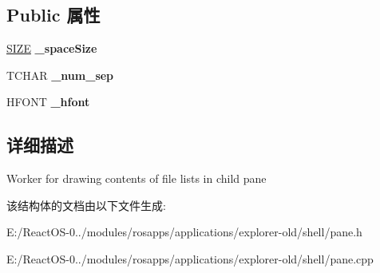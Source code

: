 \subsection*{Public 属性}
\begin{DoxyCompactItemize}
\item 
\mbox{\label{struct_output_worker_a613e14cddecdd0e4a2e044d6e0089809}} 
\hyperlink{structtag_s_i_z_e}{S\+I\+ZE} {\bfseries \+\_\+space\+Size}
\item 
\mbox{\label{struct_output_worker_a8f014088c81eaba6a5fb0f16c76f4b77}} 
T\+C\+H\+AR {\bfseries \+\_\+num\+\_\+sep}
\item 
\mbox{\label{struct_output_worker_aa559eab2efeaf1e40f67140fc3726a6e}} 
H\+F\+O\+NT {\bfseries \+\_\+hfont}
\end{DoxyCompactItemize}


\subsection{详细描述}
Worker for drawing contents of file lists in child pane 

该结构体的文档由以下文件生成\+:\begin{DoxyCompactItemize}
\item 
E\+:/\+React\+O\+S-\/0../modules/rosapps/applications/explorer-\/old/shell/pane.\+h\item 
E\+:/\+React\+O\+S-\/0../modules/rosapps/applications/explorer-\/old/shell/pane.\+cpp\end{DoxyCompactItemize}
